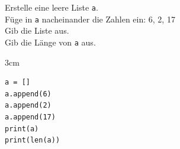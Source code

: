 \question[3]
Erstelle eine leere Liste \texttt{a}. \\
Füge in \texttt{a} nacheinander die Zahlen ein: 6, 2, 17 \\
Gib die Liste aus. \\
Gib die Länge von \texttt{a} aus.
 


\begin{solutionbox}{3cm}
\begin{lstlisting}
a = []
a.append(6)
a.append(2)
a.append(17)
print(a)
print(len(a))
\end{lstlisting}
\end{solutionbox}
